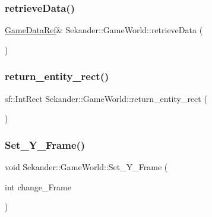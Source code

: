 \subsubsection{\texorpdfstring{retrieve\+Data()}{retrieveData()}}
{\footnotesize\ttfamily \hyperlink{namespaceSekander_a1d69b002ba2d23020901c28f0def5e16}{Game\+Data\+Ref}\& Sekander\+::\+Game\+World\+::retrieve\+Data (\begin{DoxyParamCaption}{ }\end{DoxyParamCaption})\hspace{0.3cm}{\ttfamily [inline]}}

\mbox{\label{classSekander_1_1GameWorld_a060069f1527245efc49cc4bae9306c8d}} 
\subsubsection{\texorpdfstring{return\+\_\+entity\+\_\+rect()}{return\_entity\_rect()}}
{\footnotesize\ttfamily sf\+::\+Int\+Rect Sekander\+::\+Game\+World\+::return\+\_\+entity\+\_\+rect (\begin{DoxyParamCaption}{ }\end{DoxyParamCaption})\hspace{0.3cm}{\ttfamily [inline]}}

\mbox{\label{classSekander_1_1GameWorld_aaa990ab4fb0cc708a7f12ec798ba90ef}} 
\subsubsection{\texorpdfstring{Set\+\_\+\+Y\+\_\+\+Frame()}{Set\_Y\_Frame()}}
{\footnotesize\ttfamily void Sekander\+::\+Game\+World\+::\+Set\+\_\+\+Y\+\_\+\+Frame (\begin{DoxyParamCaption}\item[{int}]{change\+\_\+\+Frame }\end{DoxyParamCaption})\hspace{0.3cm}{\ttfamily [inline]}}

